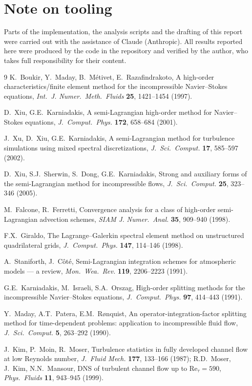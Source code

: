 \documentclass[11pt,a4paper]{article}
\begin{document}
\section*{Note on tooling}
Parts of the implementation, the analysis scripts and the drafting of this
report were carried out with the assistance of Claude (Anthropic). All results
reported here were produced by the code in the repository and verified by the
author, who takes full responsibility for their content.
\begin{thebibliography}{9}
K.~Boukir, Y.~Maday, B.~M\'etivet, E.~Razafindrakoto,
A high-order characteristics/finite element method for the incompressible
Navier--Stokes equations,
\emph{Int.\ J. Numer.\ Meth.\ Fluids} \textbf{25}, 1421--1454 (1997).

D.~Xiu, G.E.~Karniadakis,
A semi-Lagrangian high-order method for Navier--Stokes equations,
\emph{J.~Comput.\ Phys.} \textbf{172}, 658--684 (2001).

J.~Xu, D.~Xiu, G.E.~Karniadakis,
A semi-Lagrangian method for turbulence simulations using mixed spectral
discretizations,
\emph{J.~Sci.\ Comput.} \textbf{17}, 585--597 (2002).

D.~Xiu, S.J.~Sherwin, S.~Dong, G.E.~Karniadakis,
Strong and auxiliary forms of the semi-Lagrangian method for incompressible
flows,
\emph{J.~Sci.\ Comput.} \textbf{25}, 323--346 (2005).

M.~Falcone, R.~Ferretti,
Convergence analysis for a class of high-order semi-Lagrangian advection
schemes,
\emph{SIAM J. Numer.\ Anal.} \textbf{35}, 909--940 (1998).

F.X.~Giraldo,
The Lagrange--Galerkin spectral element method on unstructured quadrilateral
grids,
\emph{J.~Comput.\ Phys.} \textbf{147}, 114--146 (1998).

A.~Staniforth, J.~C\^ot\'e,
Semi-Lagrangian integration schemes for atmospheric models --- a review,
\emph{Mon.\ Wea.\ Rev.} \textbf{119}, 2206--2223 (1991).

G.E.~Karniadakis, M.~Israeli, S.A.~Orszag,
High-order splitting methods for the incompressible Navier--Stokes equations,
\emph{J.~Comput.\ Phys.} \textbf{97}, 414--443 (1991).

Y.~Maday, A.T.~Patera, E.M.~R{\o}nquist,
An operator-integration-factor splitting method for time-dependent problems:
application to incompressible fluid flow,
\emph{J.~Sci.\ Comput.} \textbf{5}, 263--292 (1990).

J.~Kim, P.~Moin, R.~Moser,
Turbulence statistics in fully developed channel flow at low Reynolds number,
\emph{J.~Fluid Mech.} \textbf{177}, 133--166 (1987);
R.D.~Moser, J.~Kim, N.N.~Mansour,
DNS of turbulent channel flow up to $\mathrm{Re}_\tau=590$,
\emph{Phys.\ Fluids} \textbf{11}, 943--945 (1999).
\end{thebibliography}
\end{document}

